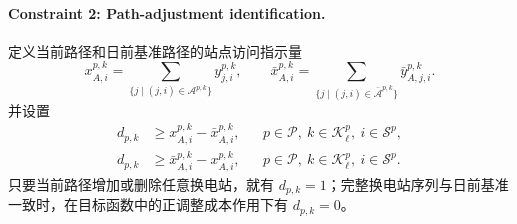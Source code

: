 \documentclass[12pt,a4paper,UTF8]{ctexart}
\begin{document}
\paragraph{Constraint 2: Path-adjustment identification.}
定义当前路径和日前基准路径的站点访问指示量
\begin{equation}
x_{A,i}^{p,k}
=
\sum_{\{j\mid(j,i)\in\mathcal A^{p,k}\}}y_{j,i}^{p,k},
\qquad
\bar x_{A,i}^{p,k}
=
\sum_{\{j\mid(j,i)\in\bar{\mathcal A}^{p,k}\}}\bar y_{A,j,i}^{p,k}.
\label{eq:station_visit_indicator}
\end{equation}
并设置
\begin{subequations}
\label{eq:path_adjustment_indicator}
\begin{align}
d_{p,k}
&\ge x_{A,i}^{p,k}-\bar x_{A,i}^{p,k},
&&p\in\mathcal P,\ k\in\mathcal K_\ell^p,\ i\in\mathcal S^p,\\
d_{p,k}
&\ge \bar x_{A,i}^{p,k}-x_{A,i}^{p,k},
&&p\in\mathcal P,\ k\in\mathcal K_\ell^p,\ i\in\mathcal S^p.
\end{align}
\end{subequations}
只要当前路径增加或删除任意换电站，就有 $d_{p,k}=1$；完整换电站序列与日前基准一致时，在目标函数中的正调整成本作用下有 $d_{p,k}=0$。
\end{document}
